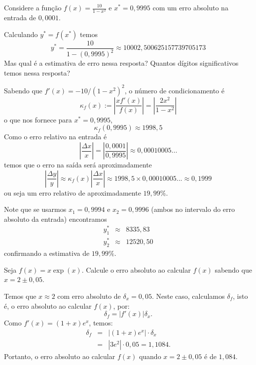 \begin{ex}
 Considere a função $f(x) = \frac{10}{1-x^2}$ e $x^*=0,9995$ com um erro absoluto na entrada de $0,0001$. 
 
 Calculando $y^*=f(x^*)$ temos 
\begin{equation*}
   y^* = \frac{10}{1-(0,9995)^2} \approx 10002,500625157739705173
\end{equation*}
 Mas qual é a estimativa de erro nessa resposta? Quantos dígitos significativos temos nessa resposta?
 
Sabendo que $f'(x)=-10/(1-x^2)^2$, o número de condicionamento é 
\begin{equation*}
   \kappa_f(x) := \left| \frac{ x f'(x)}{f(x)} \right| = \left| \frac{ 2x^2}{1-x^2} \right|
\end{equation*}
o que nos fornece para $x^*=0,9995$,
\begin{equation*}
   \kappa_f(0,9995) \approx 1998,5
\end{equation*}
Como o erro relativo na entrada é 
\begin{equation*}
   \left|\frac{\Delta x}{x}\right| = \left|\frac{0,0001}{0,9995}\right| \approx  0,00010005...
\end{equation*}
temos que o erro na saída será aproximadamente
\begin{equation*}
   \left|\frac{\Delta y}{y}\right| \approx \kappa_f(x) \left|\frac{\Delta x}{x}\right| \approx  1998,5 \times 0,00010005... \approx 0,1999
\end{equation*}
ou seja um erro relativo de aproximadamente $19,99 \%$.

Note que se usarmos $x_1 = 0,9994$ e $x_2 = 0,9996$ (ambos no intervalo do erro absoluto da entrada) encontramos
\begin{eqnarray*}
   y_1^*  &\approx&  8335,83 \\
   y_2^*  &\approx& 12520,50
\end{eqnarray*}
confirmando a estimativa de $19,99 \%$.
\end{ex}



\begin{ex}
  Seja $f(x) = x\exp(x)$. Calcule o erro absoluto ao calcular $f(x)$ sabendo que $x = 2 \pm 0,05$.
\end{ex}
\begin{sol}
  Temos que $x\approx 2$ com erro absoluto de $\delta_x = 0,05$. Neste caso, calculamos $\delta_f$, isto é, o erro absoluto ao calcular $f(x)$, por:
  \begin{equation*}
    \delta_f = |f'(x)|\delta_x.
  \end{equation*}
Como $f'(x) = (1 + x)e^{x}$, temos:
\begin{eqnarray*}
  \delta_f &=& |(1 + x)e^{x}|\cdot\delta_x\\
  &=& |3e^2|\cdot 0,05 = 1,1084.
\end{eqnarray*}
Portanto, o erro absoluto ao calcular $f(x)$ quando $x=2\pm 0,05$ é de $1,084$.
\end{sol}

